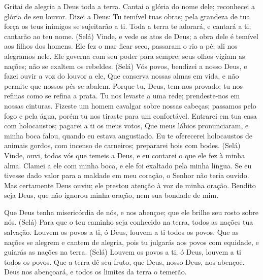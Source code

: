 
{\PP 
  Gritai de alegria a Deus toda a terra.
  Cantai a glória do nome dele; reconhecei a glória de seu louvor.
  Dizei a Deus: Tu
{} temível
{} tuas obras; pela grandeza de tua força os teus inimigos se sujeitarão a ti.
  Toda a terra te adorará, e cantará a ti; cantarão ao teu nome. (Selá)
  Vinde, e vede os atos de Deus; a obra dele é temível aos filhos dos homens.
  Ele fez o mar ficar seco, passaram o rio a pé; ali nos alegramos nele.
  Ele governa com seu poder para sempre; seus olhos vigiam as nações; não se exaltem os rebeldes. (Selá)
  Vós povos, bendizei a nosso Deus, e fazei ouvir a voz do louvor a ele,
  Que conserva nossas almas em vida, e não permite que nossos pés se abalem.
  Porque tu, Deus, tem nos provado; tu nos refinas como se refina a prata.
  Tu nos levaste a uma rede; prendeste-nos em nossas cinturas.
  Fizeste um homem cavalgar sobre nossas cabeças; passamos pelo fogo e pela água, porém tu nos tiraste para um
{} confortável.
  Entrarei em tua casa com holocaustos; pagarei a ti os meus votos,
  Que meus lábios pronunciaram, e minha boca falou, quando eu estava angustiado.
  Eu te oferecerei holocaustos de animais gordos, com incenso de carneiros; prepararei bois com bodes. (Selá)
  Vinde, ouvi, todos vós que temeis a Deus, e eu contarei o que ele fez à minha alma.
  Clamei a ele com minha boca, e ele foi exaltado pela minha língua.
  Se eu tivesse dado valor para a maldade em meu coração, o Senhor não teria
{} ouvido.
  Mas certamente Deus
{} ouviu; ele prestou atenção à voz de minha oração.
  Bendito seja Deus, que não ignorou minha oração, nem sua bondade
{} de mim.
\par }


{\PP 
  Que Deus tenha misericórdia de nós, e nos abençoe; que ele brilhe seu rosto sobre nós. (Selá)
  Para que o teu caminho seja conhecido na terra,
{} todos as nações
{} tua salvação.
  Louvem os povos a ti, ó Deus, louvem a ti todos os povos.
  Que as nações se alegrem e cantem de alegria, pois tu julgarás aos povos com equidade, e guiarás as nações na terra. (Selá)
  Louvem os povos a ti, ó Deus, louvem a ti todos os povos.
  Que a terra dê seu fruto,
{} que Deus, nosso Deus, nos abençoe.
  Deus nos abençoará, e todos os limites da terra o temerão.
\par }

